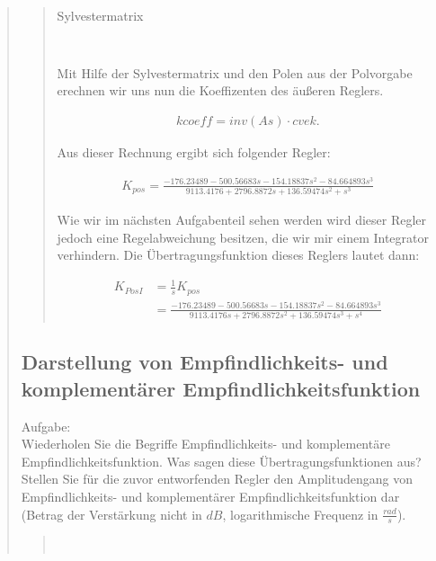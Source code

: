 \begin{quote}
\begin{quote}
\begin{table}[H]
\begin{tabular}{c c c c c c c c}
        \end{tabular}
        \caption{Sylvestermatrix}
        \end{table} 
          \\
         
         Mit Hilfe der Sylvestermatrix und den Polen aus der Polvorgabe erechnen wir uns nun die Koeffizenten des
         äußeren Reglers.
         
         \begin{equation*}
        	\begin{split}
        		kcoeff = inv(As) \cdot cvek.
        	\end{split}
        \end{equation*}
                
        
        Aus dieser Rechnung ergibt sich folgender Regler:
        
        \begin{equation*}
        	\begin{split}
        		K_{pos} = \frac{- 176.23489 - 500.56683s - 154.18837s^2 - 84.664893s^3 }{9113.4176 + 2796.8872s + 136.59474s^2
        		+ s^3 }
        	\end{split}
        \end{equation*}
        
        Wie wir im nächsten Aufgabenteil sehen werden wird dieser Regler jedoch eine Regelabweichung besitzen, die wir
        mir einem Integrator verhindern. Die Übertragungsfunktion dieses Reglers lautet dann:
        
        \begin{equation*}
        	\begin{split}
        		K_{PosI} &= \frac{1}{s} K_{pos}\\
        		         &= \frac{- 176.23489 - 500.56683s - 154.18837s^2 - 84.664893s^3 }{9113.4176s + 2796.8872s^2 +
        		         136.59474s^3 + s^4 }
        	\end{split}
        \end{equation*}        
    \end{quote}  %
        
    \subsection{Darstellung von Empfindlichkeits- und komplementärer Empfindlichkeitsfunktion}
    Aufgabe:\\
    Wiederholen Sie die Begriffe Empfindlichkeits- und komplementäre Empfindlichkeitsfunktion. Was sagen diese
    Übertragungsfunktionen aus? Stellen Sie für die zuvor entworfenden Regler den Amplitudengang von Empfindlichkeits-
    und komplementärer Empfindlichkeitsfunktion dar (Betrag der Verstärkung nicht in $dB$, logarithmische Frequenz in
    $\frac{rad}{s}$).
    \begin{quote}
         \\
    \end{quote}  %
    

\end{quote}
